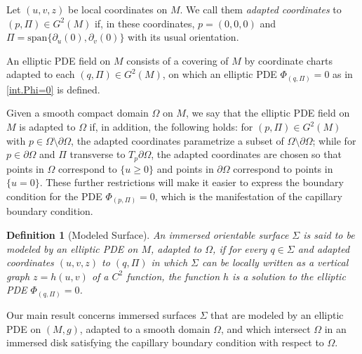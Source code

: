 \documentclass[11pt,reqno]{amsart}
\newtheorem{definition}[theorem]{Definition} %
\begin{document}
Let $(u,v,z)$ be local coordinates on $M$. We call them \textit{adapted coordinates} to $(p,\Pi)\in G^2(M)$ if, in these coordinates, $p=(0,0,0)$ and $\Pi=\text{span}\{\partial_u(0),\partial_v(0)\}$ with its usual orientation. 

An elliptic PDE field on $M$ consists of a covering of $M$ by coordinate charts adapted to each $(q,\Pi)\in G^2(M)$, on which an elliptic PDE $\Phi_{(q,\Pi)}=0$ as in \eqref{int.Phi=0} is defined.

Given a smooth compact domain $\Omega$ on $M$, we say that the elliptic PDE field on $M$ is adapted to $\Omega$ if, in addition, the following holds: for $(p,\Pi) \in G^2(M)$ with $p \in \Omega \setminus \partial \Omega$, the adapted coordinates parametrize a subset of $\Omega \setminus \partial \Omega$; while for $p \in \partial \Omega$ and $\Pi$ transverse to $T_p \partial \Omega$, the adapted coordinates are chosen so that points in $\Omega$ correspond to $\{u \geq 0\}$ and points in $\partial \Omega$ correspond to points in $\{u = 0\}$. These further restrictions will make it easier to express the boundary condition for the PDE $\Phi_{(p,\Pi)} = 0$, which is the manifestation of the capillary boundary condition.

\begin{definition}[Modeled Surface] An immersed orientable surface $\Sigma$ is said to be modeled by an elliptic PDE on $M$, adapted to $\Omega$, if for every $q \in \Sigma$ and adapted coordinates $(u,v,z)$ to $(q,\Pi)$ in which $\Sigma$ can be locally written as a vertical graph $z = h(u,v)$ of a $C^2$ function, the function $h$ is a solution to the elliptic PDE $\Phi_{(q,\Pi)} = 0$.
\end{definition}


Our main result concerns immersed surfaces $\Sigma$ that are modeled by an elliptic PDE on $(M,g)$, adapted to a smooth domain $\Omega$, and which intersect $\Omega$ in an immersed disk satisfying the capillary boundary condition with respect to $\Omega$.
\end{document}
